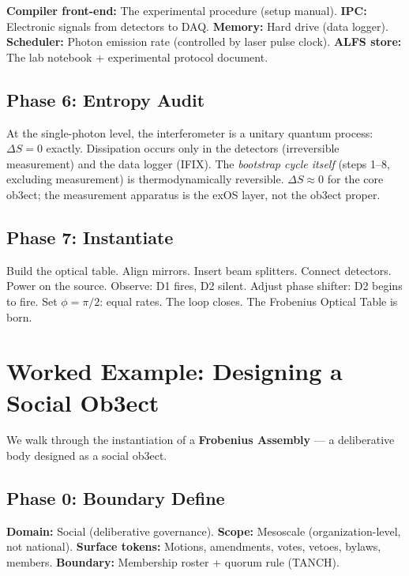 \documentclass[12pt,a4paper]{article}
\begin{document}
\textbf{Compiler front-end:} The experimental procedure (setup manual).
\textbf{IPC:} Electronic signals from detectors to DAQ.
\textbf{Memory:} Hard drive (data logger).
\textbf{Scheduler:} Photon emission rate (controlled by laser pulse clock).
\textbf{ALFS store:} The lab notebook + experimental protocol document.

\subsection*{Phase 6: Entropy Audit}

At the single-photon level, the interferometer is a unitary quantum process:
$\Delta S = 0$ exactly. Dissipation occurs only in the detectors (irreversible
measurement) and the data logger (IFIX). The \emph{bootstrap cycle itself}
(steps 1--8, excluding measurement) is thermodynamically reversible.
$\Delta S \approx 0$ for the core ob3ect; the measurement apparatus is the
exOS layer, not the ob3ect proper.

\subsection*{Phase 7: Instantiate}

Build the optical table. Align mirrors. Insert beam splitters. Connect detectors.
Power on the source. Observe: D1 fires, D2 silent. Adjust phase shifter: D2 begins
to fire. Set $\phi = \pi/2$: equal rates. The loop closes. The Frobenius Optical
Table is born.

\section{Worked Example: Designing a Social Ob3ect}

We walk through the instantiation of a \textbf{Frobenius Assembly} — a deliberative
body designed as a social ob3ect.

\subsection*{Phase 0: Boundary Define}

\textbf{Domain:} Social (deliberative governance). \textbf{Scope:} Mesoscale
(organization-level, not national). \textbf{Surface tokens:} Motions, amendments,
votes, vetoes, bylaws, members. \textbf{Boundary:} Membership roster + quorum rule (TANCH).
\end{document}
